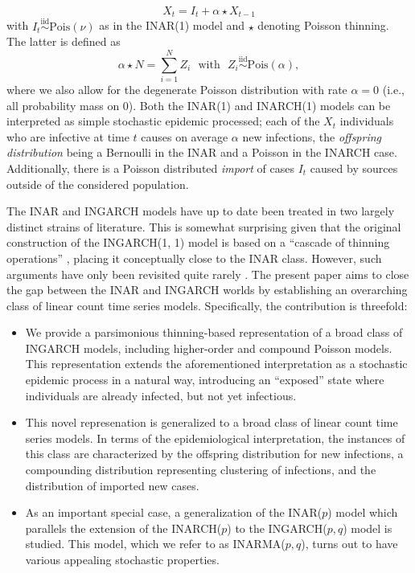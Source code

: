 \documentclass{article}
\begin{document}
$$
X_t = I_t + \alpha \star X_{t- 1}
$$
with $I_t \stackrel{\text{iid}}{\sim} \text{Pois}(\nu)$ as in the INAR(1) model and $\star$ denoting Poisson thinning. The latter is defined as
$$
\alpha \star N = \sum_{i = 1}^N Z_i \ \ \ \text{with} \ \ \ Z_i \stackrel{\text{iid}}{\sim} \text{Pois}(\alpha),
$$
where we also allow for the degenerate Poisson distribution with rate $\alpha = 0$ (i.e., all probability mass on 0). Both the INAR(1) and INARCH(1) models can be interpreted as simple stochastic epidemic processed; each of the $X_t$ individuals who are infective at time $t$ causes on average $\alpha$ new infections, the \textit{offspring distribution} being a Bernoulli in the INAR and a Poisson in the INARCH case. Additionally, there is a Poisson distributed \textit{import} of cases $I_t$ caused by sources outside of the considered population.

The INAR and INGARCH models have up to date been treated in two largely distinct strains of literature. This is somewhat surprising given that the original construction of the INGARCH(1, 1) model is based on a ``cascade of thinning operations'' \citep[p.927]{Ferland2006}, placing it conceptually close to the INAR class. However, such arguments have only been revisited quite rarely \citep{Lu2021}. The present paper aims to close the gap between the INAR and INGARCH worlds by establishing an overarching class of linear count time series models. Specifically, the contribution is threefold:
\begin{itemize}
\item We provide a parsimonious thinning-based representation of a broad class of INGARCH models, including higher-order and compound Poisson \cite{Goncalves2015} models. This representation extends the aforementioned interpretation as a stochastic epidemic process in a natural way, introducing an ``exposed'' state where  individuals are already infected, but not yet infectious.
\item This novel represenation is generalized to a broad class of linear count time series models. In terms of the epidemiological interpretation, the instances of this class are characterized by the offspring distribution for new infections, a compounding distribution representing clustering of infections, and the distribution of imported new cases. %
\item As an important special case, a generalization of the INAR($p$) model which parallels the extension of the INARCH($p$) to the INGARCH($p, q$) model is studied. This model, which we refer to as INARMA($p, q$), turns out to have various appealing stochastic properties.
\end{itemize}
\end{document}
